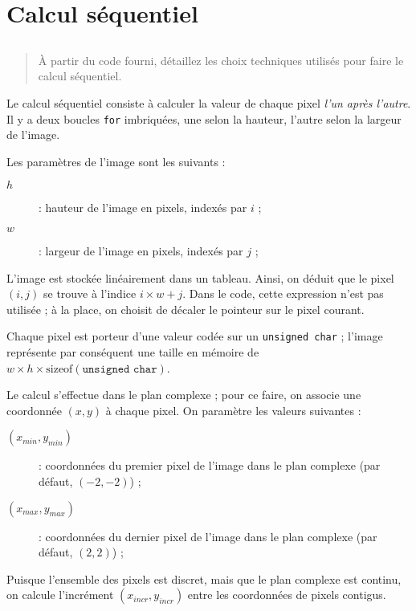 \section{Calcul séquentiel}


\subsection{}

\begin{quotation}
  \noindent À partir du code fourni, détaillez les choix techniques
  utilisés pour faire le calcul séquentiel.
\end{quotation}

Le calcul séquentiel consiste à calculer la valeur de chaque pixel
\emph{l'un après l'autre}. Il y a deux boucles \texttt{for}
imbriquées, une selon la hauteur, l'autre selon la largeur de l'image.

Les paramètres de l'image sont les suivants :

\begin{description}
\item[$h$] : hauteur de l'image en pixels, indexés par $i$ ;
\item[$w$] : largeur de l'image en pixels, indexés par $j$ ;
\end{description}

L'image est stockée linéairement dans un tableau. Ainsi, on déduit que
le pixel $(i, j)$ se trouve à l'indice $i \times w + j$. Dans le code, cette
expression n'est pas utilisée ; à la place, on choisit de décaler le
pointeur sur le pixel courant.

Chaque pixel est porteur d'une valeur codée sur un \texttt{unsigned
  char} ; l'image représente par conséquent une taille en mémoire de
$w \times h \times \mathrm{sizeof}(\texttt{unsigned char})$.

Le calcul s'effectue dans le plan complexe ; pour ce faire, on associe
une coordonnée $(x, y)$ à chaque pixel. On paramètre les valeurs
suivantes :

\begin{description}
\item[$(x_{min}, y_{min})$] : coordonnées du premier pi\-xel de l'image
  dans le plan complexe (par défaut, $(-2, -2)$) ;
\item[$(x_{max}, y_{max})$] : coordonnées du dernier pi\-xel de l'image
  dans le plan complexe (par défaut, $(2, 2)$) ;
\end{description}

Puisque l'ensemble des pixels est discret, mais que le plan complexe
est continu, on calcule l'incrément $(x_{incr}, y_{incr})$ entre les
coordonnées de pixels contigus.


